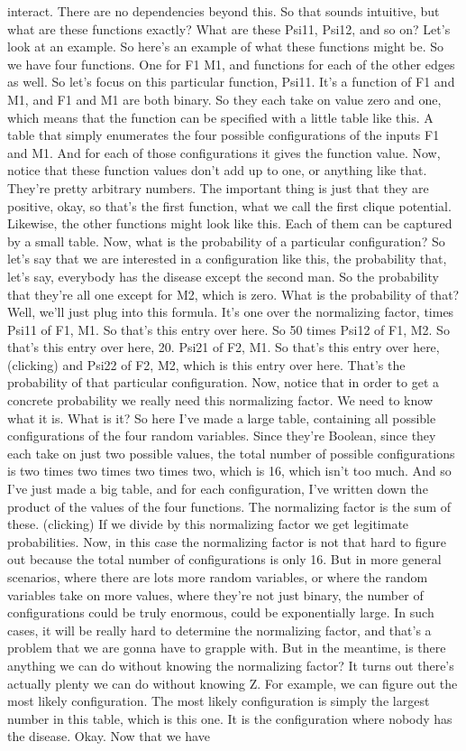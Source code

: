 \documentclass{article}
\begin{document}
\begin{flushleft}
interact. There are no dependencies beyond this. So that sounds intuitive, but what are these functions exactly? What are these Psi11, Psi12, and so on? Let's look at an example. So here's an example of what these functions might be. So we have four functions. One for F1 M1, and functions for each of the other edges as well. So let's focus on this particular function, Psi11. It's a function of F1 and M1, and F1 and M1 are both binary. So they each take on value zero and one, which means that the function can be specified with a little table like this. A table that simply enumerates the four possible configurations of the inputs F1 and M1. And for each of those configurations it gives the function value. Now, notice that these function values don't add up to one, or anything like that. They're pretty arbitrary numbers. The important thing is just that they are positive, okay, so that's the first function, what we call the first clique potential. Likewise, the other functions might look like this. Each of them can be captured by a small table. Now, what is the probability of a particular configuration? So let's say that we are interested in a configuration like this, the probability that, let's say, everybody has the disease except the second man. So the probability that they're all one except for M2, which is zero. What is the probability of that? Well, we'll just plug into this formula. It's one over the normalizing factor, times Psi11 of F1, M1. So that's this entry over here. So 50 times Psi12 of F1, M2. So that's this entry over here, 20. Psi21 of F2, M1. So that's this entry over here, (clicking) and Psi22 of F2, M2, which is this entry over here. That's the probability of that particular configuration. Now, notice that in order to get a concrete probability we really need this normalizing factor. We need to know what it is. What is it? So here I've made a large table, containing all possible configurations of the four random variables. Since they're Boolean, since they each take on just two possible values, the total number of possible configurations is two times two times two times two, which is 16, which isn't too much. And so I've just made a big table, and for each configuration, I've written down the product of the values of the four functions. The normalizing factor is the sum of these. (clicking) If we divide by this normalizing factor we get legitimate probabilities. Now, in this case the normalizing factor is not that hard to figure out because the total number of configurations is only 16. But in more general scenarios, where there are lots more random variables, or where the random variables take on more values, where they're not just binary, the number of configurations could be truly enormous, could be exponentially large. In such cases, it will be really hard to determine the normalizing factor, and that's a problem that we are gonna have to grapple with. But in the meantime, is there anything we can do without knowing the normalizing factor? It turns out there's actually plenty we can do without knowing Z. For example, we can figure out the most likely configuration. The most likely configuration is simply the largest number in this table, which is this one. It is the configuration where nobody has the disease. Okay. Now that we have 
\end{flushleft}
\end{document}
